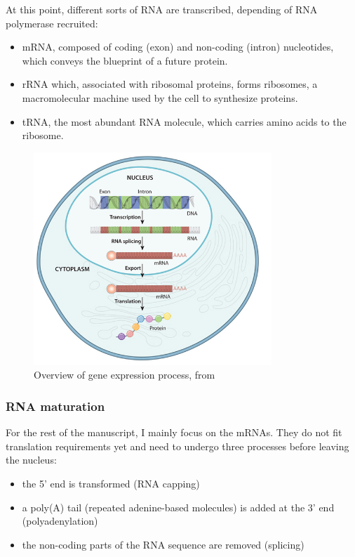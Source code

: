\noindent
At this point, different sorts of \ac{RNA} are transcribed, depending of \ac{RNA} polymerase recruited:
\begin{itemize}
	\setlength\itemsep{0.1em}
	\item \ac{mRNA}, composed of coding (exon) and non-coding (intron) nucleotides, which conveys the blueprint of a future protein.
	\item \ac{rRNA} which, associated with ribosomal proteins, forms ribosomes, a macromolecular machine used by the cell to synthesize proteins.
	\item \ac{tRNA}, the most abundant \ac{RNA} molecule, which carries amino acids to the ribosome.
\end{itemize}

\begin{figure}[]
    \centering
    \includegraphics[width=0.8\textwidth]{figures/introduction/gene_expression_process.jpg}
    \caption[Schema of gene expression process]{Overview of gene expression process, from~\cite{cell_essential_nature}}
    \label{fig:gene_expression}
\end{figure}

\subsubsection{RNA maturation}

For the rest of the manuscript, I mainly focus on the \ac{mRNA}s.
They do not fit translation requirements yet and need to undergo three processes before leaving the nucleus:
\begin{itemize}
	\setlength\itemsep{0.1em}
	\item the 5' end is transformed (\ac{RNA} capping)
	\item a poly(A) tail (repeated adenine-based molecules) is added at the 3' end (polyadenylation)
	\item the non-coding parts of the \ac{RNA} sequence are removed (splicing)
\end{itemize}

